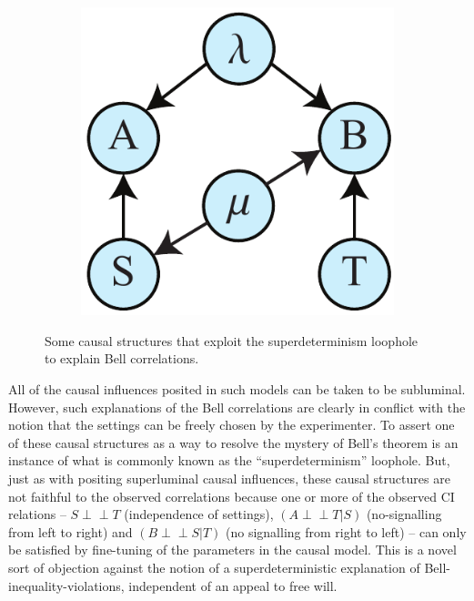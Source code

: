 \documentclass[12pt,onecolumn,nofootinbib]{revtex4-2}
\def\indep{\perp\!\!\!\!\perp}
\begin{document}
\begin{figure}[h]
\begin{subfigure}[b]{0.18\textwidth}
             	\subcaption{}
                	\label{fig:superdetb}
        \end{subfigure}
        \hspace{5em}
        \begin{subfigure}[b]{0.18\textwidth}
                	\centering
        	\includegraphics[width=\textwidth]{bell-SB}
             	\subcaption{}
                	\label{fig:superdetc}
        \end{subfigure}
 \caption{Some causal structures that exploit the superdeterminism loophole to explain Bell correlations.}
\label{fig:superdet}
\end{figure}

All of the causal influences posited in such models can be taken to be subluminal.  However, such explanations of the Bell correlations are clearly in conflict with the notion that the settings can be freely chosen by the experimenter. To assert one of these causal structures as a way to resolve the mystery of Bell's theorem is an instance of what is commonly known as the ``superdeterminism'' loophole.
But, just as with positing superluminal causal influences, these causal structures are not faithful to the observed correlations because one or more of the observed CI relations -- $S \indep T$ (independence of settings),  $\left( A\indep T|S\right)$ (no-signalling from left to right) and $\left( B\indep S|T\right)$ (no signalling from right to left) -- can only be satisfied by fine-tuning of the parameters in the causal model.  This is a novel sort of objection against the notion of a superdeterministic explanation of Bell-inequality-violations, independent of an appeal to free will.
\end{document}

